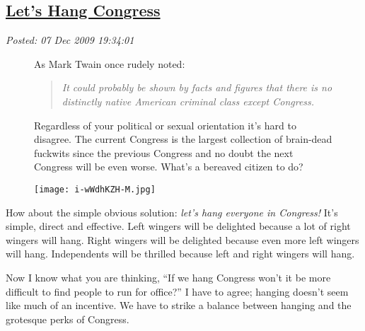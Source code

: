 %

\subsection*{\href{http://bakerjd99.wordpress.com/2009/12/07/lets-hang-congress/}{Let's Hang Congress}}


\noindent\emph{Posted: 07 Dec 2009 19:34:01}
\vspace{6pt}


\begin{figure}[ht]
\begin{minipage}[b]{0.50\textwidth}
\setlength{\parindent}{\minindent}
As
Mark Twain once rudely noted:


\begin{quotation}
\emph{It could probably be shown by facts and figures that there is no
distinctly native American criminal class except Congress.}
\end{quotation}


Regardless of your political or sexual orientation it's hard to
disagree. The current Congress is the largest collection of brain-dead
fuckwits since the previous Congress and no doubt the next Congress will
be even worse. What's a bereaved citizen to do?
\end{minipage}
\hspace{1pt}
\begin{minipage}[b]{0.45\textwidth}
\centering
\texttt{[image: i-wWdhKZH-M.jpg]}
\label{fig:302X0}
\end{minipage}
\end{figure}

How about the simple obvious solution: \emph{let's hang everyone in
Congress!} It's simple, direct and effective. Left wingers will be
delighted because a lot of right wingers will hang. Right wingers will
be delighted because even more left wingers will hang. Independents will
be thrilled because left and right wingers will hang.

Now I know what you are thinking, ``If we hang Congress won't it be more
difficult to find people to run for office?'' I have to agree; hanging
doesn't seem like much of an incentive. We have to strike a balance
between hanging and the grotesque perks of Congress.


